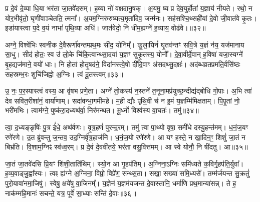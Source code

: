 प्र दे॒वं दे॒व्या धि॒या भर॑ता जा॒तवे॑दसम्। ह॒व्या नो॑ वक्षदानु॒षक्। अ॒यमु॒ ष्य प्र दे॑व॒युर्\mbox{}होता॑ य॒ज्ञाय॑ नीयते। रथो॒ न योर॒भीवृ॑तो॒ घृणी॑वाञ्चेतति॒ त्मना᳚। अ॒यम॒ग्निरु॑रुष्यत्य॒मृता॑दिव॒ जन्म॑नः। सह॑सश्चि॒थ्सही॑यां दे॒वो जी॒वात॑वे कृ॒तः। इडा॑यास्त्वा प॒दे व॒यं नाभा॑ पृथि॒व्या अधि॑। जात॑वेदो॒ नि धी॑म॒ह्यग्ने॑ ह॒व्याय॒ वोढ॑वे।॥३२॥

अग्ने॒ विश्वे॑भिः स्वनीक दे॒वैरूर्णा॑वन्तम्प्रथ॒मः सी॑द॒ योनिम्᳚। कु॒ला॒यिनं॑ घृ॒तव॑न्तꣳ सवि॒त्रे य॒ज्ञं न॑य॒ यज॑मानाय सा॒धु। सीद॑ होतः॒ स्व उ॑ लो॒के चि॑कि॒त्वान्थ्सा॒दया॑ य॒ज्ञꣳ सु॑कृ॒तस्य॒ योनौ᳚। दे॒वा॒वीर्दे॒वान् ह॒विषा॑ यजा॒स्यग्ने॑ बृ॒हद्यज॑माने॒ वयो॑ धाः। नि होता॑ होतृ॒षद॑ने॒ विदा॑नस्त्वे॒षो दी॑दि॒वाꣳ अ॑सदथ्सु॒दक्षः॑। अद॑ब्धव्रतप्रमति॒र्वसि॑ष्ठः सहस्रम्भ॒रः शुचि॑जिह्वो अ॒ग्निः। त्वं दू॒तस्त्वम्॥३३॥

उ॒ नः॒ प॒र॒स्पास्त्वं वस्य॒ आ वृ॑षभ प्रणे॒ता। अग्ने॑ तो॒कस्य॑ न॒स्तने॑ त॒नूना॒मप्र॑युच्छ॒न्दीद्य॑द्बोधि गो॒पाः। अ॒भि त्वा॑ देव सवित॒रीशा॑नं॒ वार्या॑णाम्। सदा॑वन्भा॒गमी॑महे। म॒ही द्यौः पृ॑थि॒वी च॑ न इ॒मं य॒ज्ञम्मि॑मिक्षताम्। पि॒पृ॒तां नो॒ भरी॑मभिः। त्वाम॑ग्ने॒ पुष्क॑रा॒दध्यथ॑र्वा॒ निर॑मन्थत। मू॒र्ध्नो विश्व॑स्य वा॒घतः॑। तमु॑॥३४॥

त्वा॒ द॒ध्यङ्ङृषिः॑ पु॒त्र ई॑धे॒ अथ॑र्वणः। वृ॒त्र॒हणं॑ पुरन्द॒रम्। तमु॑ त्वा पा॒थ्यो वृषा॒ समी॑धे दस्यु॒हन्त॑मम्। ध॒नं॒ज॒यꣳ रणे॑रणे। उ॒त ब्रु॑वन्तु ज॒न्तव॒ उद॒ग्निर्वृ॑त्र॒हाज॑नि। ध॒नं॒ज॒यो रणे॑रणे। आ यꣳ हस्ते॒ न खा॒दिन॒ꣳ॒ शिशुं॑ जा॒तं न बिभ्र॑ति। वि॒शाम॒ग्निꣴ स्व॑ध्व॒रम्। प्र दे॒वं दे॒ववी॑तये॒ भर॑ता वसु॒वित्त॑मम्। आ स्वे योनौ॒ नि षी॑दतु। आ॥३५॥


जा॒तं जा॒तवे॑दसि प्रि॒यꣳ शि॑शी॒ताति॑थिम्। स्यो॒न आ गृ॒हप॑तिम्। अ॒ग्निना॒ऽग्निः समि॑ध्यते क॒विर्गृ॒हप॑ति॒र्युवा᳚। ह॒व्य॒वाड्जु॒ह्वा᳚स्यः। त्वꣴ ह्य॑ग्ने अ॒ग्निना॒ विप्रो॒ विप्रे॑ण॒ सन्थ्स॒ता। सखा॒ सख्या॑ समि॒ध्यसे᳚। तम्म॑र्जयन्त सु॒क्रतुं॑ पुरो॒यावा॑नमा॒जिषु॑। स्वेषु॒ क्षये॑षु वा॒जिनम्᳚। य॒ज्ञेन॑ य॒ज्ञम॑यजन्त दे॒वास्तानि॒ धर्मा॑णि प्रथ॒मान्या॑सन्न्। ते ह॒ नाक॑म्महि॒मानः॑ सचन्ते॒ यत्र॒ पूर्वे॑ सा॒ध्याः सन्ति॑ दे॒वाः॥३६॥


{\anuvakamend[{वोढ॑वे दू॒तस्त्वन्तमु॑ सीद॒त्वा यत्र॑ च॒त्वारि॑ च}]}%

{}

